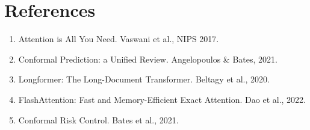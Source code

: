 \documentclass[11pt]{article}
\begin{document}
\section*{References}
\begin{enumerate}
\item Attention is All You Need. Vaswani et al., NIPS 2017.
\item Conformal Prediction: a Unified Review. Angelopoulos \& Bates, 2021.
\item Longformer: The Long-Document Transformer. Beltagy et al., 2020.
\item FlashAttention: Fast and Memory-Efficient Exact Attention. Dao et al., 2022.
\item Conformal Risk Control. Bates et al., 2021.
\end{enumerate}
\end{document}
